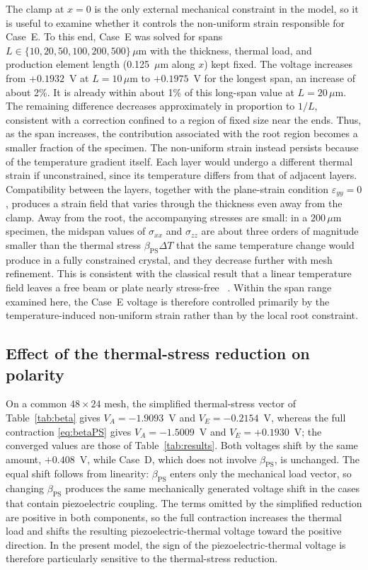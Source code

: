 \documentclass[pdflatex,sn-mathphys-num]{sn-jnl}
\begin{document}
The clamp at $x=0$ is the only external mechanical constraint in the model, so it is
useful to examine whether it controls the non-uniform strain responsible for Case~E.
To this end, Case~E was solved for spans
$L\in\{10,20,50,100,200,500\}\,\mu\text{m}$ with the thickness, thermal load, and
production element length (0.125~$\mu$m along $x$) kept fixed. The voltage increases
from $+0.1932$~V at $L=10\,\mu\text{m}$ to $+0.1975$~V for the longest span, an
increase of about 2\%. It is already within about 1\% of this long-span value at
$L=20\,\mu\text{m}$. The remaining difference decreases approximately in proportion
to $1/L$, consistent with a correction confined to a region of fixed size near the
ends. Thus, as the span increases, the contribution associated with the root region
becomes a smaller fraction of the specimen. The non-uniform strain instead persists
because of the temperature gradient itself. Each layer would undergo a different
thermal strain if unconstrained, since its temperature differs from that of adjacent
layers. Compatibility between the layers, together with the plane-strain condition
$\varepsilon_{yy}=0$, produces a strain field that varies through the thickness even
away from the clamp. Away from the root, the accompanying stresses are small: in a
$200\,\mu$m specimen, the midspan values of $\sigma_{xx}$ and $\sigma_{zz}$ are about
three orders of magnitude smaller than the thermal stress
$\beta_{\mathrm{PS}}\Delta T$ that the same temperature change would produce in a
fully constrained crystal, and they decrease further with mesh refinement. This is
consistent with the classical result that a linear temperature field leaves a free
beam or plate nearly stress-free ~\cite{BoleyWeiner1997}. Within the span range
examined here, the Case~E voltage is therefore controlled primarily by the
temperature-induced non-uniform strain rather than by the local root constraint.

\subsection{Effect of the thermal-stress reduction on polarity}
\label{sec:polarity}

On a common $48\times24$ mesh, the simplified thermal-stress vector of
Table~\ref{tab:beta} gives $V_A=-1.9093$~V and $V_E=-0.2154$~V, whereas the full
contraction \eqref{eq:betaPS} gives $V_A=-1.5009$~V and $V_E=+0.1930$~V; the
converged values are those of Table~\ref{tab:results}. Both voltages shift by the same
amount, $+0.408$~V, while Case~D, which does not involve $\beta_{\mathrm{PS}}$, is
unchanged. The equal shift follows from linearity: $\beta_{\mathrm{PS}}$ enters only
the mechanical load vector, so changing $\beta_{\mathrm{PS}}$ produces the same
mechanically generated voltage shift in the cases that contain piezoelectric coupling.
The terms omitted by the simplified reduction are positive in both components, so the
full contraction increases the thermal load and shifts the resulting
piezoelectric-thermal voltage toward the positive direction. In the present model,
the sign of the piezoelectric-thermal voltage is therefore particularly sensitive to
the thermal-stress reduction.
\end{document}
